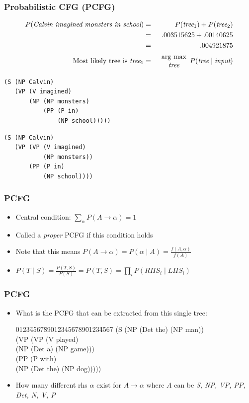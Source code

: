 \begin{frame}[fragile]
\frametitle{Probabilistic CFG (PCFG)}
\begin{eqnarray}
P(\textit{Calvin imagined monsters in school}) & = &
P(\textit{tree$_1$}) + P(\textit{tree$_2$}) \nonumber\\ 
& = & .003515625 + .00140625 \nonumber \\
& = & .004921875 \nonumber\\
\textrm{Most likely tree is \textit{tree$_1$}} & = & \begin{array}{c}\mbox{arg max}\\\textit{tree}\end{array} P(\textit{tree} \mid \textit{input}) \nonumber
\end{eqnarray}
\bigskip
\begin{minipage}{4in}
\begin{verbatim}
(S (NP Calvin)
   (VP (V imagined)
       (NP (NP monsters)
           (PP (P in)
               (NP school)))))
\end{verbatim}
\end{minipage}
\begin{minipage}{4in}
\begin{verbatim}
(S (NP Calvin)
   (VP (VP (V imagined)
           (NP monsters))
       (PP (P in)
           (NP school))))
\end{verbatim}
\end{minipage}

\end{frame}

\begin{frame}
\frametitle{PCFG}
\begin{itemize}
\item Central condition: \( \sum_\alpha P( A \rightarrow \alpha) = 1 \)
\item Called a {\em proper} PCFG if this condition holds
\item Note that this means $P( A \rightarrow \alpha) = P( \alpha \mid A) = \frac{f(A, \alpha)}{f(A)}$
\item \( P(T \mid S) = \frac{P(T,S)}{P(S)} = P(T,S) = \prod_i P(RHS_i \mid LHS_i) \)
\end{itemize}

\end{frame}

\begin{frame}
\frametitle{PCFG}
\begin{itemize}
\item What is the PCFG that can be extracted from this single tree: 
\begin{tabbing}
0123\=4567\=8901\=2345\=6789\=0123\=4567 \kill
(S \>(NP (Det the) (NP man)) \\
\> (VP \> (VP \> (V played) \\
\> \> \> (NP (Det a) (NP game))) \\
\> \> (PP \>(P with) \\
\> \> \> (NP (Det the) (NP dog)))))
\end{tabbing}
\item How many different rhs $\alpha$ exist for $A \rightarrow \alpha$ where $A$ can be {\it S, NP, VP, PP, Det, N, V, P}
\end{itemize}

\end{frame}

